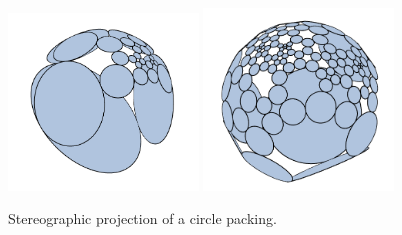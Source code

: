 \documentclass[a4paper,UKenglish]{lipics}
\begin{document}
  \begin{figure}[ht]
    \centering
      \includegraphics[width = 0.45\textwidth]{figures/3D.png}
      \includegraphics[width = 0.45\textwidth]{figures/3D_2.png}
    \caption{Stereographic projection of a circle packing.}
    \label{fig:3D}
  \end{figure}
\end{document}
